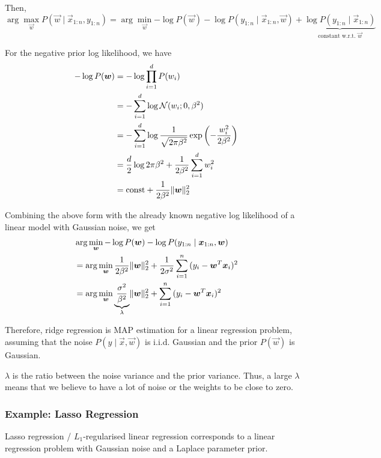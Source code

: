 Then,
\begin{equation*}
\arg\max_{\vec{w}}{
	P(\vec{w} \mid \vec{x}_{1:n}, y_{1:n})
}
= \arg\min_{\vec{w}}{
	-\log{P(\vec{w})}
	-\log{P(y_{1:n} \mid \vec{x}_{1:n}, \vec{w})}
	+ \underbrace{\log{P(y_{1:n} \mid \vec{x}_{1:n})}}_\text{constant w.r.t. $\vec{w}$}
}
\end{equation*}

For the negative prior log likelihood, we have
\begin{align*}
-\log{P(\boldsymbol{w})} &=
-\log{\prod_{i=1}^d{P(w_i)}} \\
&= - \sum_{i=1}^d{\log{\mathcal{N}(w_i ; 0, \beta^2)}} \\
&= - \sum_{i=1}^d{\log{
		\frac{1}{\sqrt{2 \pi \beta^2}}
		\exp{\left( -\frac{w_i^2}{2 \beta^2} \right)}
}} \\
&= \frac{d}{2} \log{2 \pi \beta^2}
+ \frac{1}{2 \beta^2} \sum_{i=1}^d{w_i^2} \\
&= \text{const} + \frac{1}{2 \beta^2} \lVert\boldsymbol{w}\rVert_2^2
\end{align*}

Combining the above form with the already known negative log
likelihood of a linear model with Gaussian noise, we get
\begin{align*}
& \arg\min_{\boldsymbol{w}}{
	-\log{P(\boldsymbol{w})}
	-\log{P(y_{1:n} \mid \boldsymbol{x}_{1:n}, \boldsymbol{w})}
} \\
&= \arg\min_{\boldsymbol{w}}{
	\frac{1}{2\beta^2} \lVert\boldsymbol{w}\rVert_2^2
	+ \frac{1}{2\sigma^2} \sum_{i=1}^n{(y_i - \boldsymbol{w}^T \boldsymbol{x}_i)^2}
} \\
&= \arg\min_{\boldsymbol{w}}{
	\underbrace{\frac{\sigma^2}{\beta^2}}_\lambda \lVert\boldsymbol{w}\rVert_2^2
	+ \sum_{i=1}^n{(
		y_i - \boldsymbol{w}^T \boldsymbol{x}_i
		)^2}
}
\end{align*}

Therefore, ridge regression is MAP estimation
for a linear regression problem, assuming that
the noise $P(y \mid \vec{x}, \vec{w})$ is
i.i.d. Gaussian and the prior $P(\vec{w})$
is Gaussian.

$\lambda$ is the ratio between the noise variance
and the prior variance.
Thus, a large $\lambda$ means that we believe to
have a lot of noise or the weights to be close to zero.


\subsubsection{Example: Lasso Regression}
Lasso regression / $L_1$-regularised linear regression
corresponds to a linear regression problem with Gaussian
noise and a Laplace parameter prior.

